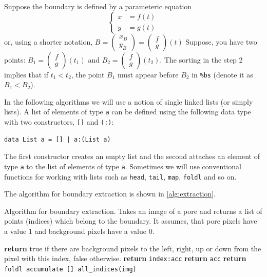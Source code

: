 \documentclass[reprint,amsmath,amssymb,aps,pre,showkeys,showpacs]{revtex4-1}
\begin{document}
Suppose the boundary is defined by a parameteric equation
\begin{equation*}
  \left\{
  \begin{aligned}
    x &= f(t) \\
    y &= g(t)
  \end{aligned}
  \right.
\end{equation*}
or, using a shorter notation,
$B = \begin{pmatrix} x_B \\ y_B \end{pmatrix} = \begin{pmatrix} f \\ g \end{pmatrix}(t)$
Suppose, you have two points: $B_1 = \begin{pmatrix} f \\ g \end{pmatrix}(t_1)$
and $B_2 = \begin{pmatrix} f \\ g \end{pmatrix}(t_2)$. The sorting in the step 2
implies that if $t_1 < t_2$, the point $B_1$ must appear before $B_2$ in
\texttt{\%bs} (denote it as $B_1 < B_2$).

In the following algorithms we will use a notion of single linked lists (or
simply lists). A list of elements of type \texttt{a} can be defined using the
following data type with two constructors, \texttt{[]} and \texttt{(:)}:
\begin{verbatim}
data List a = [] | a:(List a)
\end{verbatim}
The first constructor creates an empty list and the second attaches an element
of type \texttt{a} to the list of elements of type \texttt{a}. Sometimes we will
use conventional functions for working with lists such as \texttt{head},
\texttt{tail}, \texttt{map}, \texttt{foldl} and so on\cite[Chapter~4: Functional
programming]{o2008real}.

The algorithm for boundary extraction is shown in \cref{alg:extraction}.
\begin{algorithm}[H]
  \caption{Algorithm for boundary extraction. Takes an image of a pore and
    returns a list of points (indices) which belong to the boundary. It assumes,
  that pore pixels have a value 1 and background pixels have a value 0.}
  \label{alg:extraction}
  \begin{algorithmic}[1]
    \State \textbf{return} true if there are background pixels to the left,
    right, up or down from the pixel with this index, false otherwise.
    \EndProcedure
    \State \textbf{return} \texttt{index:acc}
    \Else
    \State \textbf{return} \texttt{acc}
    \EndIf
    \EndProcedure
    \State \textbf{return} \texttt{foldl accumulate [] all\_indices(img)}
    \EndProcedure
  \end{algorithmic}
\end{algorithm}
\end{document}
